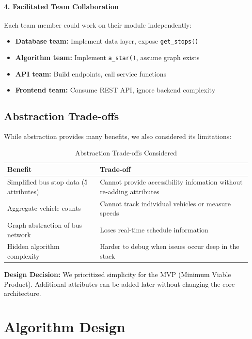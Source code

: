 \paragraph{4. Facilitated Team Collaboration}
Each team member could work on their module independently:
\begin{itemize}[noitemsep]
    \item \textbf{Database team:} Implement data layer, expose \texttt{get\_stops()}
    \item \textbf{Algorithm team:} Implement \texttt{a\_star()}, assume graph exists
    \item \textbf{API team:} Build endpoints, call service functions
    \item \textbf{Frontend team:} Consume REST API, ignore backend complexity
\end{itemize}

\subsection{Abstraction Trade-offs}

While abstraction provides many benefits, we also considered its limitations:

\begin{table}[H]
    \centering
    \renewcommand{\arraystretch}{1.2}
    \begin{tabularx}{\textwidth}{|X|X|}
        \hline
        \textbf{Benefit} & \textbf{Trade-off} \\
        \hline
        Simplified bus stop data (5 attributes) & Cannot provide accessibility infomation without re-adding attributes \\
        \hline
        Aggregate vehicle counts & Cannot track individual vehicles or measure speeds \\
        \hline
        Graph abstraction of bus network & Loses real-time schedule information \\
        \hline
        Hidden algorithm complexity & Harder to debug when issues occur deep in the stack \\
        \hline
    \end{tabularx}
    \caption{Abstraction Trade-offs Considered}
\end{table}

\textbf{Design Decision:} We prioritized simplicity for the MVP (Minimum Viable Product). Additional attributes can be added later without changing the core architecture.

\section{Algorithm Design}

